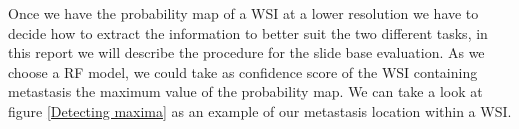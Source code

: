 \documentclass[a4paper,10pt]{article}
\begin{document}
Once we have the probability map of a WSI at a lower resolution we have to decide how to extract the information to better suit the two different tasks, in this report we will describe the procedure for the slide base evaluation. As we choose a RF model, we could take as confidence score of the WSI containing metastasis the maximum value of the probability map. 
We can take a look at figure \ref{Detecting maxima} as an example of our metastasis location within a WSI.
\end{document}
